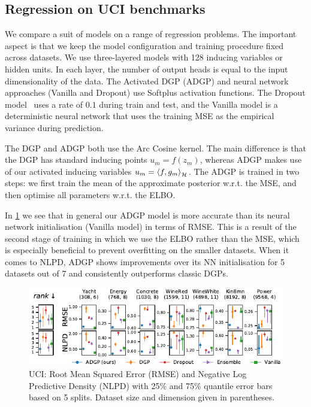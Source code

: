 \subsection{Regression on UCI benchmarks}
We compare a suit of models on a range of regression problems. The important aspect is that we keep the model configuration and training procedure fixed across datasets. We use three-layered models with 128 inducing variables or hidden units. In each layer, the number of output heads is equal to the input dimensionality of the data. The Activated DGP (ADGP) and neural network approaches (Vanilla and Dropout) use Softplus activation functions. The Dropout model~\citep{Gal2016dropout} uses a rate of $0.1$ during train and test, and the Vanilla model is a deterministic neural network that uses the training MSE as the empirical variance during prediction.

The DGP and ADGP both use the Arc Cosine kernel. The main difference is that the DGP has standard inducing points $u_m = f(z_m)$, whereas ADGP makes use of our activated inducing variables $u_m = \langle f, g_m \rangle_{{\mathcal{H}}}^{}$. The ADGP is trained in two steps: we first train the mean of the approximate posterior w.r.t. the MSE, and then optimise all parameters w.r.t. the ELBO.

In \cref{fig:uci} we see that in general our ADGP model is more accurate than its neural network initialisation (Vanilla model) in terms of RMSE. This is a result of the second stage of training in which we use the ELBO rather than the MSE, which is especially beneficial to prevent overfitting on the smaller datasets. When it comes to NLPD, ADGP shows improvements over its NN initialisation for 5 datasets out of 7 and consistently outperforms classic DGPs.

\begin{figure}
    \centering
    \includegraphics[width=\textwidth]{uci_small}
    \caption{UCI: Root Mean Squared Error (RMSE) and Negative Log Predictive Density (NLPD) with 25\% and 75\% quantile error bars based on 5 splits. Dataset size and dimension given in parentheses.}
    \label{fig:uci}
\end{figure}

